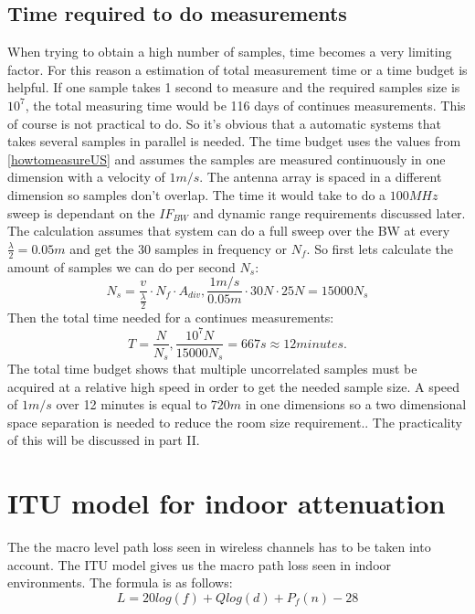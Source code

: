 \subsection{Time required to do measurements}
When trying to obtain a high number of samples, time becomes a very limiting factor. For this reason a estimation of total measurement time or a time budget is helpful. If one sample takes 1 second to measure and the required samples size is $10^7$, the total measuring time would be 116 days of continues measurements. This of course is not practical to do. So it's obvious that a automatic systems that takes several samples in parallel is needed. The time budget uses the values from  \autoref{howtomeasureUS} and assumes the samples are measured continuously in one dimension with a velocity of $1m/s$. 
The antenna array is spaced in a different dimension so samples don't overlap. The time it would take to do a $100MHz$ sweep is dependant on the $IF_{BW}$ and dynamic range requirements discussed later. The calculation assumes that system can do a full sweep over the BW at every $\frac{\lambda}{2} = 0.05m$ and get the 30 samples in frequency or $N_f$. So first lets calculate the amount of samples we can do per second $N_s$:
\begin{equation}
N_s = \frac{v}{\frac{\lambda}{2}}\cdot N_f \cdot A_{div}, \frac{1m/s}{0.05m} \cdot 30N \cdot 25N = 15000N_s
\end{equation}
Then the total time needed for a continues measurements:
\begin{equation}
T = \frac{N}{N_s} , \frac{10^7N}{15000N_s} = 667s \approx 12 minutes.
\end{equation}
The total time budget shows that multiple uncorrelated samples must be acquired at a relative high speed in order to get the needed sample size. A speed of $1m/s$ over 12 minutes is equal to $720m$ in one dimensions so a two dimensional space separation is needed to reduce the room size requirement.. The practicality of this will be discussed in part II.


\section{ITU model for indoor attenuation}
The the macro level path loss seen in wireless channels has to be taken into account. The ITU model gives us the macro path loss seen in indoor environments. The formula is as follows:
\begin{equation}
L = 20log (f) + Q log (d) + P_f(n) - 28
\end{equation}

